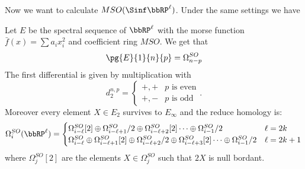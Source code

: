 Now we want to calculate $MSO(\Sinf\bbRP^\ell)$. Under the same settings we have
\begin{prop}
    Let $E$ be the spectral sequence of $\bbRP^\ell$ with the morse function $\bar{f}(x)=\sum a_i x_i^2$ and coefficient ring $MSO$. We get that
    \begin{equation*}
        \pg{E}{1}{n}{p} = \Omega^{SO}_{n-p}
    \end{equation*}
    The first differential is given by multiplication with
    \begin{equation*}
        d_2^{n,p}=\begin{cases}
            +,+ & p\text{ is even} \\
            +,- & p \text{ is odd}
        \end{cases}.
    \end{equation*}
    Moreover every element $X \in E_2$ survives to $E_\infty$ and the reduce homology is:
    \begin{equation*}
        \Omega^{SO}_i(\bbRP^\ell) = \begin{cases}
            \Omega^{SO}_{i-\ell}[2]\oplus  \Omega^{SO}_{i-\ell+1}/2 \oplus \Omega^{SO}_{i-\ell+2}[2] \dots
            \oplus \Omega^{SO}_{i-1}/2 & \ell = 2k \\
            \Omega^{SO}_{i-\ell} \oplus  \Omega^{SO}_{i-\ell+1}[2] \oplus \Omega^{SO}_{i-\ell+2}/2 \oplus \Omega^{SO}_{i-\ell+3}[2] \dots \oplus \Omega^{SO}_{i-1}/2 & \ell=2k+1
        \end{cases}
    \end{equation*}
    where  $\Omega^{SO}_j[2]$ are the elements $X \in \Omega^{SO}_j$ such that $2X$ is null bordant.
\end{prop}
